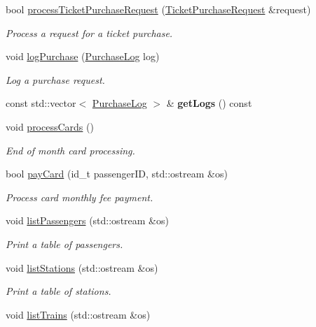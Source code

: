 \begin{DoxyCompactItemize}
bool \mbox{\hyperlink{classSystem_ac2b6f3d934b64f4fa56ffb1db1d261df}{process\+Ticket\+Purchase\+Request}} (\mbox{\hyperlink{classTicketPurchaseRequest}{Ticket\+Purchase\+Request}} \&request)
\begin{DoxyCompactList}\small\item\em Process a request for a ticket purchase. \end{DoxyCompactList}\item 
void \mbox{\hyperlink{classSystem_a3d823d755bcbc5843dd261b88693bc69}{log\+Purchase}} (\mbox{\hyperlink{classPurchaseLog}{Purchase\+Log}} log)
\begin{DoxyCompactList}\small\item\em Log a purchase request. \end{DoxyCompactList}\item 
\mbox{\label{classSystem_af8aa6900656b6e81c7f13db29782baa4}} 
const std\+::vector$<$ \mbox{\hyperlink{classPurchaseLog}{Purchase\+Log}} $>$ \& {\bfseries get\+Logs} () const
\item 
void \mbox{\hyperlink{classSystem_aebffe11376f68cb17175f30ea517c10b}{process\+Cards}} ()
\begin{DoxyCompactList}\small\item\em End of month card processing. \end{DoxyCompactList}\item 
bool \mbox{\hyperlink{classSystem_a93e28750e7677d09a7eb2acfc2590209}{pay\+Card}} (id\+\_\+t passenger\+ID, std\+::ostream \&os)
\begin{DoxyCompactList}\small\item\em Process card monthly fee payment. \end{DoxyCompactList}\item 
void \mbox{\hyperlink{classSystem_a23c0b01d0e84fa4665ce85203ce6747b}{list\+Passengers}} (std\+::ostream \&os)
\begin{DoxyCompactList}\small\item\em Print a table of passengers. \end{DoxyCompactList}\item 
void \mbox{\hyperlink{classSystem_a06041827a7b47ad06eee9d121e42590c}{list\+Stations}} (std\+::ostream \&os)
\begin{DoxyCompactList}\small\item\em Print a table of stations. \end{DoxyCompactList}\item 
void \mbox{\hyperlink{classSystem_a0a6c0d8d1061893151f9b4ee3332ce85}{list\+Trains}} (std\+::ostream \&os)

\end{DoxyCompactItemize}
